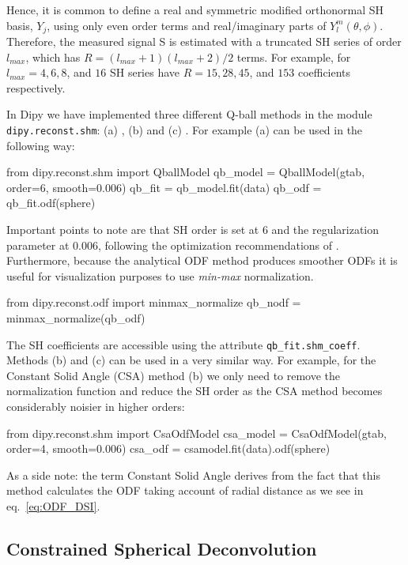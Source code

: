 \documentclass{bioinfo}
\begin{document}

Hence, it is common to define a real and
symmetric modified orthonormal SH basis, $Y_{j}$, using only even order terms
and real/imaginary parts of $Y_{l}^{m}(\theta, \phi)$. Therefore, the measured
signal S is estimated with a truncated SH series of order $l_{max}$, which has
$R = (l_{max} +1)( l_{max} +2)/2$ terms. For example, for $l_{max} = 4, 6, 8$,
and $16$ SH series have $R = 15, 28, 45$, and $153$ coefficients respectively.

In Dipy we have implemented three different Q-ball methods in the
module \texttt{dipy.reconst.shm}: (a)
\citet{descoteaux-angelino-etal:07}, (b) \citet{aganj-lenglet-etal:10}
and (c) \citet{tristan-vega-westin-etal:09}. For
example (a) can be used in the following way:
\begin{python}
from dipy.reconst.shm import QballModel
qb_model = QballModel(gtab, order=6, smooth=0.006)
qb_fit = qb_model.fit(data)
qb_odf = qb_fit.odf(sphere)
\end{python}
Important points to note are that SH order is set at $6$ and the regularization
parameter at $0.006$, following the optimization recommendations of
\citet{descoteaux-angelino-etal:06c}. Furthermore, because the
analytical ODF method produces smoother ODFs it is useful for visualization purposes to use \emph{min-max}
normalization.
\begin{python}
from dipy.reconst.odf import minmax_normalize
qb_nodf = minmax_normalize(qb_odf)
\end{python}
The SH coefficients are accessible using the attribute
\texttt{qb\_fit.shm\_coeff}. Methods (b) and (c) can be used in a very similar
way. For example, for the Constant Solid Angle (CSA)
\citep{aganj-lenglet-etal:10} method (b) we only need to remove the
normalization function and reduce the SH order as the CSA method becomes
considerably noisier in higher orders:
\begin{python}
from dipy.reconst.shm import CsaOdfModel
csa_model = CsaOdfModel(gtab, order=4,
                        smooth=0.006)
csa_odf = csamodel.fit(data).odf(sphere)
\end{python}
As a side note: the term Constant Solid Angle derives from the fact that this
method calculates the ODF taking account of radial distance as we see in
eq.~\ref{eq:ODF_DSI}.

\subsection{Constrained Spherical Deconvolution}
\end{document}

